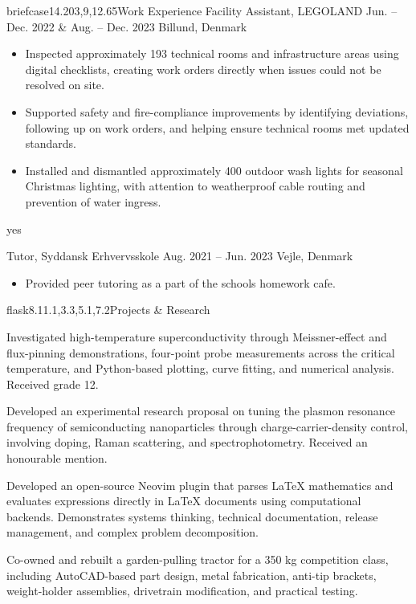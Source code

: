 \documentclass[10pt,a4paper]{article}
\begin{document}
\begin{minipage}[t]{\mainwidth}
\begin{connectedsection}{briefcase}{14.20}{3,9,12.65}{Work Experience}
    \workentry
      {Facility Assistant, LEGOLAND}
      {Jun. -- Dec. 2022 \& Aug. -- Dec. 2023}
      {Billund, Denmark}
      {
        \begin{itemize}
          \item Inspected approximately 193 technical rooms and infrastructure areas using digital checklists, creating work orders directly when issues could not be resolved on site.
          \item Supported safety and fire-compliance improvements by identifying deviations, following up on work orders, and helping ensure technical rooms met updated standards.
          \item Installed and dismantled approximately 400 outdoor wash lights for seasonal Christmas lighting, with attention to weatherproof cable routing and prevention of water ingress.
        \end{itemize}
      }
      {yes}

    \workentry
      {Tutor, Syddansk Erhvervsskole}
      {Aug. 2021 -- Jun. 2023}
      {Vejle, Denmark}
      {
        \begin{itemize}
          \item Provided peer tutoring as a part of the schools homework cafe.
        \end{itemize}
      }
      {}
  \end{connectedsection}

  \vspace{-10pt}

  \begin{connectedcontinued}{flask}{8.1}{1.1,3.3,5.1,7.2}{Projects \& Research}
    \vspace{-10pt}\par
      {Investigated high-temperature superconductivity through Meissner-effect and flux-pinning demonstrations, four-point probe measurements across the critical temperature, and Python-based plotting, curve fitting, and numerical analysis. Received grade 12.}

      {Developed an experimental research proposal on tuning the plasmon resonance frequency of semiconducting nanoparticles through charge-carrier-density control, involving doping, Raman scattering, and spectrophotometry. Received an honourable mention.}

      {Developed an open-source Neovim plugin that parses LaTeX mathematics and evaluates expressions directly in LaTeX documents using computational backends. Demonstrates systems thinking, technical documentation, release management, and complex problem decomposition.}

      {Co-owned and rebuilt a garden-pulling tractor for a 350 kg competition class, including AutoCAD-based part design, metal fabrication, anti-tip brackets, weight-holder assemblies, drivetrain modification, and practical testing.}
  \end{connectedcontinued}
\end{minipage}
\end{document}
